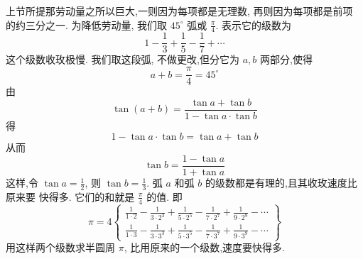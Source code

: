 上节所提那劳动量之所以巨大,一则因为每项都是无理数, 再则因为每项都是前项 的约三分之一. 为降低劳动量, 我们取 $45^{\circ}$ 弧或 $\frac{\pi}{4}$. 表示它的级数为
\[
1-\frac{1}{3}+\frac{1}{5}-\frac{1}{7}+\cdots
\]
这个级数收玫极慢. 我们取这段弧, 不做更改,但分它为 $a, b$ 两部分,使得
\[
a+b=\frac{\pi}{4}=45^{\circ}
\]
由
\[
\tan (a+b)=\frac{\tan a+\tan b}{1-\tan a \cdot \tan b}
\]
得
\[
1-\tan a \cdot \tan b=\tan a+\tan b
\]
从而 
\[
\tan b=\frac{1-\tan a}{1+\tan a}
\]
这样,令 $\tan a=\frac{1}{2}$, 则 $\tan b=\frac{1}{3}$. 弧 $a$ 和弧 $b$ 的级数都是有理的,且其收玫速度比原来要 快得多. 它们的和就是 $\frac{\pi}{4}$ 的值. 即
\[
\pi=4\left\{\begin{array}{l}
\frac{1}{1 \cdot 2}-\frac{1}{3 \cdot 2^{3}}+\frac{1}{5 \cdot 2^{5}}-\frac{1}{7 \cdot 2^{7}}+\frac{1}{9 \cdot 2^{9}}-\cdots \\
\frac{1}{1 \cdot 3}-\frac{1}{3 \cdot 3^{3}}+\frac{1}{5 \cdot 3^{5}}-\frac{1}{7 \cdot 3^{7}}+\frac{1}{9 \cdot 3^{9}}-\cdots
\end{array}\right\}
\]
用这样两个级数求半圆周 $\pi$, 比用原来的一个级数,速度要快得多. 

